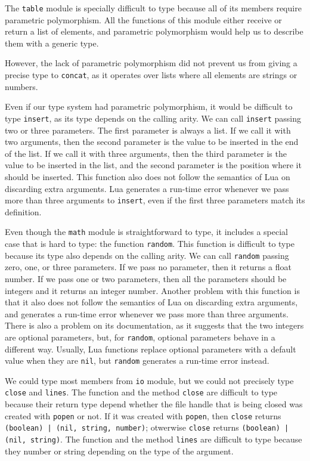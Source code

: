 The \texttt{table} module is specially difficult to type because
all of its members require parametric polymorphism.
All the functions of this module either receive or return a list
of elements, and parametric polymorphism would help us to describe
them with a generic type.

However, the lack of parametric polymorphism did not prevent us from
giving a precise type to \texttt{concat}, as it operates over lists
where all elements are strings or numbers.

Even if our type system had parametric polymorphism, it would
be difficult to type \texttt{insert}, as its type depends on
the calling arity.
We can call \texttt{insert} passing two or three parameters.
The first parameter is always a list.
If we call it with two arguments, then the second parameter
is the value to be inserted in the end of the list.
If we call it with three arguments, then the third parameter
is the value to be inserted in the list, and the second
parameter is the position where it should be inserted.
This function also does not follow the semantics of Lua on
discarding extra arguments.
Lua generates a run-time error whenever we pass more than three
arguments to \texttt{insert}, even if the first three parameters
match its definition.

Even though the \texttt{math} module is straightforward to type,
it includes a special case that is hard to type: the function \texttt{random}.
This function is difficult to type because its type also depends
on the calling arity.
We can call \texttt{random} passing zero, one, or three parameters.
If we pass no parameter, then it returns a float number.
If we pass one or two parameters, then all the parameters should be
integers and it returns an integer number.
Another problem with this function is that it also does not follow
the semantics of Lua on discarding extra arguments, and generates
a run-time error whenever we pass more than three arguments.
There is also a problem on its documentation, as it suggests that
the two integers are optional parameters, but, for \texttt{random},
optional parameters behave in a different way.
Usually, Lua functions replace optional parameters with a default value
when they are \texttt{nil}, but \texttt{random} generates a run-time
error instead.

We could type most members from \texttt{io} module, but we could not
precisely type \texttt{close} and \texttt{lines}.
The function and the method \texttt{close} are difficult to type
because their return type depend whether the file handle that is
being closed was created with \texttt{popen} or not.
If it was created with \texttt{popen}, then \texttt{close}
returns \texttt{(boolean) | (nil, string, number)};
otwerwise \texttt{close} returns \texttt{(boolean) | (nil, string)}.
The function and the method \texttt{lines} are difficult to type
because they number or string depending on the type of the argument.

